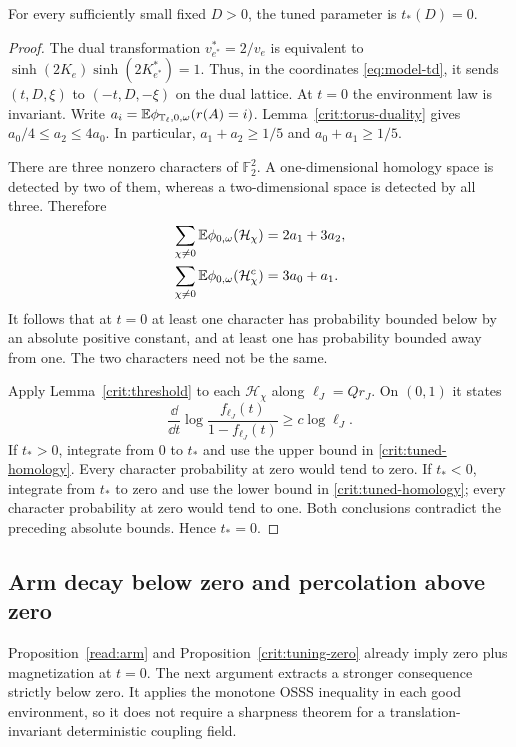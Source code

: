 \begin{proposition}\label{crit:tuning-zero}
For every sufficiently small fixed $D>0$, the tuned parameter is
$t_*(D)=0$.
\end{proposition}

\begin{proof}
The dual transformation $v_{e^*}^*=2/v_e$ is equivalent to
$\sinh(2K_e)\sinh(2K_{e^*}^*)=1$.  Thus, in the coordinates
\eqref{eq:model-td}, it sends $(t,D,\xi)$ to $(-t,D,-\xi)$ on the dual
lattice.  At $t=0$ the environment law is invariant.  Write
$a_i=\mathbb E\phi_{\mathbb T_\ell,0,\omega}(r(A)=i)$.
Lemma~\ref{crit:torus-duality} gives
$a_0/4\le a_2\le4a_0$.  In particular,
$a_1+a_2\ge1/5$ and $a_0+a_1\ge1/5$.

There are three nonzero characters of $\mathbb F_2^2$.  A one-dimensional
homology space is detected by two of them, whereas a two-dimensional
space is detected by all three.  Therefore
\begin{align*}
 \sum_{\chi\ne0}\mathbb E\phi_{0,\omega}(\mathcal H_\chi)
      &=2a_1+3a_2,\\
 \sum_{\chi\ne0}\mathbb E\phi_{0,\omega}(\mathcal H_\chi^c)
      &=3a_0+a_1.
\end{align*}
It follows that at $t=0$ at least one character has probability bounded
below by an absolute positive constant, and at least one has
probability bounded away from one.  The two characters need not be
the same.

Apply Lemma~\ref{crit:threshold} to each $\mathcal H_\chi$ along
$\ell_J=Qr_J$.  On $(0,1)$ it states
\[
 \frac{\dd}{\dd t}\log\frac{f_{\ell_J}(t)}{1-f_{\ell_J}(t)}
                         \ge c\log\ell_J.
\]
If $t_*>0$, integrate from $0$ to $t_*$ and use the upper bound in
\eqref{crit:tuned-homology}.  Every character probability at zero
would tend to zero.  If $t_*<0$, integrate from $t_*$ to zero and use
the lower bound in \eqref{crit:tuned-homology}; every character
probability at zero would tend to one.  Both conclusions contradict
the preceding absolute bounds.  Hence $t_*=0$.
\end{proof}

\subsection{Arm decay below zero and percolation above zero}

Proposition~\ref{read:arm} and Proposition~\ref{crit:tuning-zero} already
imply zero plus magnetization at $t=0$.  The next argument extracts a
stronger consequence strictly below zero.  It applies the monotone
OSSS inequality in each good environment, so it does not require a
sharpness theorem for a translation-invariant deterministic coupling
field.

